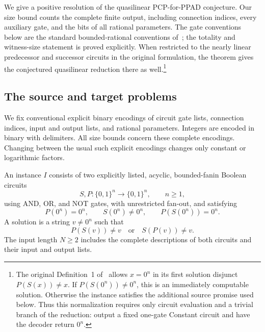 We give a positive resolution of the quasilinear PCP-for-PPAD conjecture.
Our size bound counts the complete finite output, including connection
indices, every auxiliary gate, and the bits of all rational parameters.
The gate conventions below are the standard bounded-rational conventions
of~\cite{DFHM2024,Fisher2026}; the totality and witness-size statement is
proved explicitly. When restricted to the nearly linear predecessor and
successor circuits in the original formulation, the theorem gives the
conjectured quasilinear reduction there as well.\footnote{The original
Definition~1 of~\cite{BPR2016} allows $x=0^n$ in its first solution
disjunct $P(S(x))\ne x$. If $P(S(0^n))\ne0^n$, this is an immediately
computable solution. Otherwise the instance satisfies the additional
source promise used below. Thus this normalization requires only circuit
evaluation and a trivial branch of the reduction: output a fixed one-gate
Constant circuit and have the decoder return $0^n$.}

\subsection{The source and target problems}

We fix conventional explicit binary encodings of circuit gate lists,
connection indices, input and output lists, and rational parameters.
Integers are encoded in binary with delimiters. All size bounds concern
these complete encodings. Changing between the usual such explicit
encodings changes only constant or logarithmic factors.

\begin{definition}\label{def:eol}
An instance $I$ consists of two explicitly listed, acyclic, bounded-fanin
Boolean circuits
\[
 S,P:\{0,1\}^n\longrightarrow\{0,1\}^n,\qquad n\geq1,
\]
using AND, OR, and NOT gates, with unrestricted fan-out, and satisfying
\[
 P(0^n)=0^n,\qquad S(0^n)\ne0^n,\qquad P(S(0^n))=0^n.
\]
A solution is a string $v\ne0^n$ such that
\begin{equation}\label{eq:end-of-line-solution}
 P(S(v))\ne v\quad\text{or}\quad S(P(v))\ne v.
\end{equation}
The input length $N\geq2$ includes the complete descriptions of both
circuits and their input and output lists.
\end{definition}

